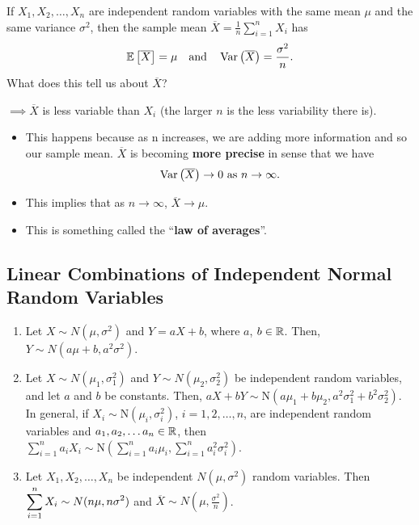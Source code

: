 \begin{remark}
    If $X_1,X_2,\ldots ,X_n$ are independent random variables with the same mean $\mu$ and the same variance $\sigma^2$, then the sample mean $\overline{X} = \frac{1}{n}\displaystyle \sum_{i=1}^{n} X_i$ has \vspace{-3mm}
    \[
        \mathbb{E}\left[{\overline{X}}\right] = \mu \quad \text{and} \quad \operatorname{Var}\left({\overline{X}}\right) = \frac{\sigma^2}{n}.
    \]
    What does this tell us about $\overline{X}$? 
    
    $\implies \overline{X}$ is less variable than $X_i$ (the larger $n$ is the less variability there is).
    \begin{itemize}
        \item This happens because as n increases, we are adding more
        information and so our sample mean. $\overline{X}$ is becoming \textbf{more precise} in sense that we have \vspace{-3mm}
        \[
            \operatorname{Var}\left({\overline{X}}\right) \to 0 \text{ as } n \to \infty.
        \]
        \item This implies that as $n\to \infty$, $\overline{X} \to \mu$.
        \item This is something called the ``\textbf{law of averages}''.
    \end{itemize}
\end{remark}

\pagebreak


\subsection{Linear Combinations of Independent Normal Random Variables}

\begin{theorem}
    \phantom{}
    \begin{enumerate}
        \item Let $X \sim N(\mu, \sigma^2)$ and $Y = aX + b$, where $a$, $b \in {\mathbb{R}}$.
        Then, $Y \sim N(a\mu + b, a^2\sigma^2)$.
        \item Let $X \sim N(\mu_1, \sigma_1^2)$ and $Y \sim N(\mu_2, \sigma_2^2)$ be independent random variables, and let $a$ and $b$ be constants.
        Then, $aX+bY \sim \text{N}(a\mu_1 + b\mu_2, a^2\sigma_1^2 + b^2\sigma_2^2)$. \\
        In general, if $X_i \sim \text{N}(\mu_i, \sigma_i^2)$, $i=1,2,\ldots,n$, are independent random variables and $a_1,a_2,\ldots a_n \in {\mathbb{R}}$, then $\displaystyle \sum_{i=1}^{n} a_iX_i \sim \text{N}\left( \displaystyle \sum_{i=1}^{n} a_i\mu_i, \displaystyle \sum_{i=1}^{n} a_i^2 \sigma_i^2 \right)$.
        \item Let $X_1, X_2, \ldots, X_n$ be independent $N(\mu, \sigma^2)$ random variables. Then
        $\displaystyle \sum_{i=1}^{n} X_i \sim N(n\mu, n\sigma^2)$ and $\overline{X} \sim N(\mu, \frac{\sigma^2}{n})$.
    \end{enumerate}
\end{theorem}

